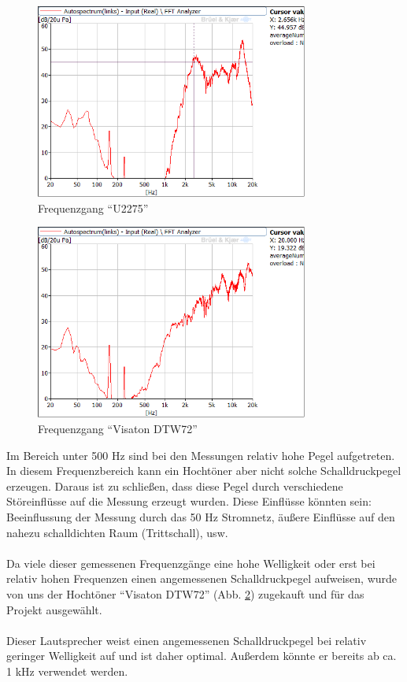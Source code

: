 \begin{figure} [H]
	\centering
	\includegraphics[width=0.8\textwidth]{img/LSMessung/HT/U2275_1m_erhoeht.png}
	\caption{Frequenzgang \enquote{U2275}}
	\label{fig:4.3.5}
\end{figure}

\begin{figure} [H]
	\centering
	\includegraphics[width=0.8\textwidth]{img/LSMessung/HT/VisatonDTW72.png}
	\caption{Frequenzgang \enquote{Visaton DTW72}}
	\label{fig:4.3.6}
\end{figure}
\newpage
Im Bereich unter 500 Hz sind bei den Messungen relativ hohe Pegel aufgetreten.
In diesem Frequenzbereich kann ein Hochtöner aber nicht solche Schalldruckpegel erzeugen.
Daraus ist zu schließen, dass diese Pegel durch verschiedene Störeinflüsse auf die Messung erzeugt wurden.
Diese Einflüsse könnten sein: Beeinflussung der Messung durch das 50 Hz Stromnetz, äußere Einflüsse auf den nahezu schalldichten Raum (Trittschall), usw.
\\ \\
Da viele dieser gemessenen Frequenzgänge eine hohe Welligkeit oder erst bei relativ hohen Frequenzen einen angemessenen Schalldruckpegel aufweisen, wurde von uns der Hochtöner \enquote{Visaton DTW72} (Abb. \ref{fig:4.3.6}) zugekauft und für das Projekt ausgewählt.
\\ \\
Dieser Lautsprecher weist einen angemessenen Schalldruckpegel bei relativ geringer Welligkeit auf und ist daher optimal.
Außerdem könnte er bereits ab ca. 1 kHz verwendet werden.

